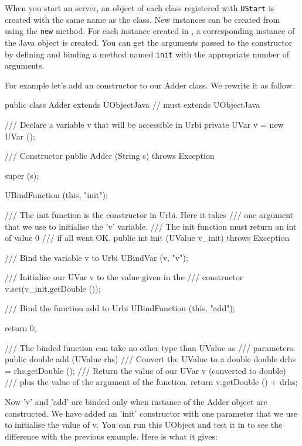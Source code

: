 When you start an \urbi server, an object of each class registered with
\lstinline{UStart} is created with the same name as the class. New instances
can be created from \urbi using the \lstinline|new| method. For each
instance created in \urbi, a corresponding instance of the Java object is
created. You can get the arguments passed to the constructor by defining and
binding a method named \lstinline|init| with the appropriate number of
arguments.

For example let's add an \urbi constructor to our Adder class. We rewrite
it as follow:

\begin{cxx}
public class Adder extends UObjectJava // must extends UObjectJava
{
    /// Declare a variable v that will be accessible in Urbi
    private UVar v = new UVar ();

    /// Constructor
    public Adder (String s)
      throws Exception {
    	super (s);

	UBindFunction (this, "init");
    }

    /// The init function is the constructor in Urbi. Here it takes
    /// one argument that we use to initialise the 'v' variable.
    /// The init function must return an int of value 0
    /// if all went OK.
    public int init (UValue v_init)
      throws Exception {

	/// Bind the variable v to Urbi
	UBindVar (v, "v");

	/// Initialise our UVar v to the value given in the
	/// constructor
	v.set(v_init.getDouble ());

	/// Bind the function add to Urbi
	UBindFunction (this, "add");

	return 0;
    }

    /// The binded function can take no other type than UValue as
    /// parameters.
    public double add (UValue rhs) {
    	/// Convert the UValue to a double
    	double drhs = rhs.getDouble ();
    	/// Return the value of our UVar v (converted to double)
    	/// plus the value of the argument of the function.
    	return v.getDouble () + drhs;
    }
}
\end{cxx}

Now 'v' and 'add' are binded only when instance of the Adder object are
constructed. We have added an 'init' constructor with one parameter that
we use to initialise the value of v. You can run this UObject and test
it in \urbi to see the difference with the previous example. Here is what
it gives:

